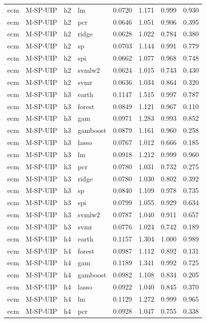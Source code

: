 \begin{ThreePartTable}
\begin{longtable}[t]{llclcccc}
ecm & M-SP-UIP & h2 & lm & 0.0720 & 1.171 & 0.999 & 0.930\\
ecm & M-SP-UIP & h2 & pcr & 0.0646 & 1.051 & 0.906 & 0.395\\
ecm & M-SP-UIP & h2 & ridge & 0.0628 & 1.022 & 0.784 & 0.380\\
ecm & M-SP-UIP & h2 & sp & 0.0703 & 1.144 & 0.991 & 0.779\\
ecm & M-SP-UIP & h2 & spi & 0.0662 & 1.077 & 0.968 & 0.748\\
ecm & M-SP-UIP & h2 & svmlw2 & 0.0624 & 1.015 & 0.743 & 0.430\\
ecm & M-SP-UIP & h2 & svmr & 0.0636 & 1.034 & 0.864 & 0.320\\
\addlinespace
ecm & M-SP-UIP & h3 & earth & 0.1147 & 1.515 & 0.997 & 0.787\\
ecm & M-SP-UIP & h3 & forest & 0.0849 & 1.121 & 0.967 & 0.110\\
ecm & M-SP-UIP & h3 & gam & 0.0971 & 1.283 & 0.993 & 0.852\\
ecm & M-SP-UIP & h3 & gamboost & 0.0879 & 1.161 & 0.960 & 0.258\\
ecm & M-SP-UIP & h3 & lasso & 0.0767 & 1.012 & 0.666 & 0.185\\
ecm & M-SP-UIP & h3 & lm & 0.0918 & 1.212 & 0.999 & 0.960\\
ecm & M-SP-UIP & h3 & pcr & 0.0780 & 1.031 & 0.732 & 0.275\\
ecm & M-SP-UIP & h3 & ridge & 0.0780 & 1.030 & 0.802 & 0.392\\
ecm & M-SP-UIP & h3 & sp & 0.0840 & 1.109 & 0.978 & 0.735\\
ecm & M-SP-UIP & h3 & spi & 0.0799 & 1.055 & 0.929 & 0.634\\
ecm & M-SP-UIP & h3 & svmlw2 & 0.0787 & 1.040 & 0.911 & 0.657\\
ecm & M-SP-UIP & h3 & svmr & 0.0776 & 1.024 & 0.742 & 0.189\\
\addlinespace
ecm & M-SP-UIP & h4 & earth & 0.1157 & 1.304 & 1.000 & 0.989\\
ecm & M-SP-UIP & h4 & forest & 0.0987 & 1.112 & 0.892 & 0.131\\
ecm & M-SP-UIP & h4 & gam & 0.1189 & 1.341 & 0.992 & 0.725\\
ecm & M-SP-UIP & h4 & gamboost & 0.0982 & 1.108 & 0.834 & 0.205\\
ecm & M-SP-UIP & h4 & lasso & 0.0922 & 1.040 & 0.845 & 0.370\\
ecm & M-SP-UIP & h4 & lm & 0.1129 & 1.272 & 0.999 & 0.965\\
ecm & M-SP-UIP & h4 & pcr & 0.0928 & 1.047 & 0.755 & 0.338\\

\end{longtable}
\end{ThreePartTable}
